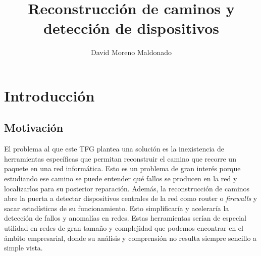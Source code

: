 \documentclass[tfg,epsbased,lof,lot,loa,covers,final,copyright,overleaf]{tfgtfmthesisuam}
\title{Reconstrucción de caminos y detección de dispositivos}
\author{David Moreno Maldonado}
\begin{document}
\chapter{Introducción}

\section{Motivación}
El problema al que este TFG plantea una solución es la inexistencia de herramientas específicas que permitan reconstruir el camino que recorre un paquete en una red informática. Esto es un problema de gran interés porque estudiando ese camino se puede entender qué fallos se producen en la red y localizarlos para su posterior reparación. Además, la reconstrucción de caminos abre la puerta a detectar dispositivos centrales de la red como \gls{router} o \textit{firewalls} y sacar estadísticas de su funcionamiento. Esto simplificaría y aceleraría la detección de fallos y anomalías en redes. Estas herramientas serían de especial utilidad en redes de gran tamaño y complejidad que podemos encontrar en el ámbito empresarial, donde su análisis y comprensión no resulta siempre sencillo a simple vista.
\end{document}
